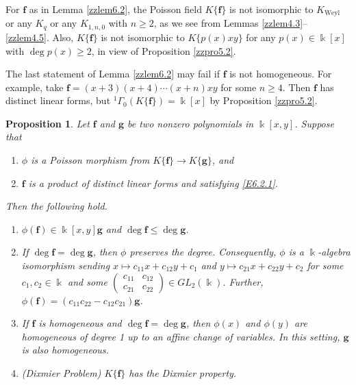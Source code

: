 \documentclass[12pt]{amsart}
\theoremstyle{plain}
\newtheorem{proposition}[theorem]{Proposition}
\numberwithin{theorem}{section}
\numberwithin{equation}{theorem}
\theoremstyle{definition}
\newcommand \bff {{\mathbf{f}}}
\newcommand \bfg {{\mathbf{g}}}
\DeclareMathOperator{\Weyl}{Weyl}
\newcommand \Kweyl {K_{\Weyl}}
\begin{document}
For $\bff$ as in Lemma \ref{zzlem6.2}, the 
Poisson field $K\{\bff\}$ is not isomorphic 
to $\Kweyl$ or any $K_q$ or any $K_{1,n,0}$ 
with $n \ge 2$, as we see from 
Lemmas \ref{zzlem4.3}--\ref{zzlem4.5}. Also, 
$K\{\bff\}$ is not isomorphic to 
$K\{p(x)xy\}$ for any $p(x) \in \Bbbk[x]$ 
with $\deg p(x) \ge 2$, in view of 
Proposition \ref{zzpro5.2}. 

The last statement of Lemma \ref{zzlem6.2} 
may fail if $\bff$ is not homogeneous.  
For example, take 
$\bff = (x+3)(x+4)\cdots(x+n)xy$ for some 
$n \ge 4$.  Then $\bff$ has distinct 
linear forms, but 
${^1\Gamma}_{0}(K\{\bff\}) = \Bbbk[x]$ 
by Proposition \ref{zzpro5.2}.

\begin{proposition}
\label{zzpro6.3} 
Let $\bff$ and $\bfg$ be two nonzero polynomials in $\Bbbk[x,y]$.
Suppose that 
\begin{enumerate}
\item[(a)]
$\phi$ is a Poisson morphism from $K\{\bff\}\to K\{\bfg\}$, and
\item[(b)]
$\bff$ is a product of distinct linear forms and satisfying
\eqref{E6.2.1}.
\end{enumerate}
Then the following hold.
\begin{enumerate}
\item[(1)]
$\phi(\bff) \in \Bbbk[x,y] \bfg$ and $\deg \bff\leq \deg \bfg$.  
\item[(2)]
If $\deg \bff=\deg \bfg$, then  $\phi$ preserves the degree.
Consequently, $\phi$ is a $\Bbbk$-algebra isomorphism sending 
$x\mapsto c_{11}x+c_{12}y+c_1$ and $y\mapsto c_{21}x+c_{22}y+c_2$ 
for some $c_1,c_2\in \Bbbk$ and some $\begin{pmatrix} c_{11}&c_{12}\\
c_{21}&c_{22}\end{pmatrix} \in GL_2(\Bbbk)$. Further, $\phi(\bff) = (c_{11}c_{22} - c_{12}c_{21}) \bfg$.
\item[(3)] 
If $\bff$ is homogeneous and $\deg \bff=\deg \bfg$, then  $\phi(x)$ and $\phi(y)$ are homogeneous of degree 1 up to an affine change of variables. In
this setting, $\bfg$ is also homogeneous.
\item[(4)]{\rm{(Dixmier Problem)}}
$K\{\bff\}$ has the Dixmier property.
\end{enumerate}
\end{proposition}
\end{document}
